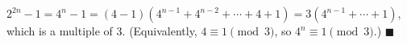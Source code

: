 $2^{2n}-1=4^n-1=(4-1)\left(4^{n-1}+4^{n-2}+\cdots+4+1\right)=3\left(4^{n-1}+\cdots+1\right)$, which is a multiple of $3$. (Equivalently, $4\equiv1\pmod3$, so $4^n\equiv1\pmod3$.) $\blacksquare$
